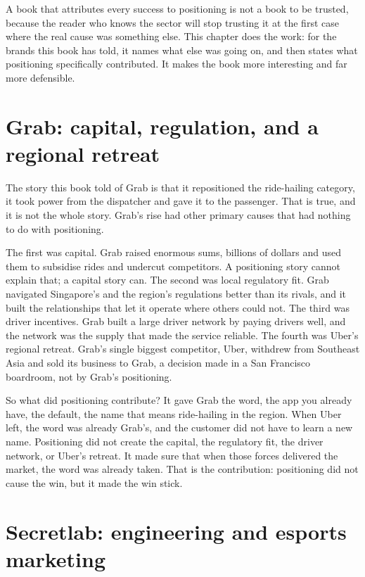 \documentclass[10pt,twoside,openany]{memoir}
\newcommand{\needspacehead}{\needspace{4\baselineskip}}
\let\oldsection\section
\renewcommand{\section}{\needspacehead\oldsection}
\begin{document}
{A book that attributes every success to positioning is not a book to be
trusted, because the reader who knows the sector will stop trusting it
at the first case where the real cause was something else. This chapter
does the work: for the brands this book has told, it names what else was
going on, and then states what positioning specifically contributed. It
makes the book more interesting and far more defensible.

\section{Grab: capital, regulation, and a regional
retreat}\label{grab-capital-regulation-and-a-regional-retreat}

The story this book told of Grab is that it repositioned the
ride-hailing category, it took power from the dispatcher and gave it to
the passenger. That is true, and it is not the whole story. Grab's rise
had other primary causes that had nothing to do with positioning.

The first was capital. Grab raised enormous sums, billions of dollars
and used them to subsidise rides and undercut competitors. A positioning
story cannot explain that; a capital story can. The second was local
regulatory fit. Grab navigated Singapore's and the region's regulations
better than its rivals, and it built the relationships that let it
operate where others could not. The third was driver incentives. Grab
built a large driver network by paying drivers well, and the network was
the supply that made the service reliable. The fourth was Uber's
regional retreat. Grab's single biggest competitor, Uber, withdrew from
Southeast Asia and sold its business to Grab, a decision made in a San
Francisco boardroom, not by Grab's positioning.

So what did positioning contribute? It gave Grab the word, the app you
already have, the default, the name that means ride-hailing in the
region. When Uber left, the word was already Grab's, and the customer
did not have to learn a new name. Positioning did not create the
capital, the regulatory fit, the driver network, or Uber's retreat. It
made sure that when those forces delivered the market, the word was
already taken. That is the contribution: positioning did not cause the
win, but it made the win stick.

\section{Secretlab: engineering and esports
marketing}\label{secretlab-engineering-and-esports-marketing}

}
\end{document}

